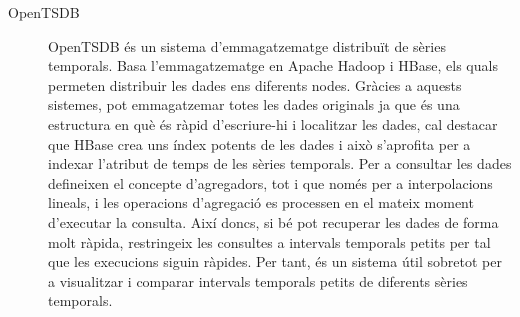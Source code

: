 \begin{description}
\item[OpenTSDB] OpenTSDB \parencite{opentsdb} és un sistema
  d'emmagatzematge distribuït de sèries temporals. Basa
  l'emmagatzematge en Apache Hadoop i HBase, els quals permeten
  distribuir les dades ens diferents nodes. Gràcies a aquests
  sistemes, pot emmagatzemar totes les dades originals ja que és una
  estructura en què és ràpid d'escriure-hi i localitzar les dades, cal
  destacar que HBase crea uns índex potents de les dades i això
  s'aprofita per a indexar l'atribut de temps de les sèries temporals.
  Per a consultar les dades defineixen el concepte d'agregadors, tot i
  que només per a interpolacions lineals, i les operacions d'agregació
  es processen en el mateix moment d'executar la consulta.  Així
  doncs, si bé pot recuperar les dades de forma molt ràpida,
  restringeix les consultes a intervals temporals petits per tal que
  les execucions siguin ràpides. Per tant, és un sistema útil sobretot
  per a visualitzar i comparar intervals temporals petits de diferents
  sèries temporals.




\end{description}






















